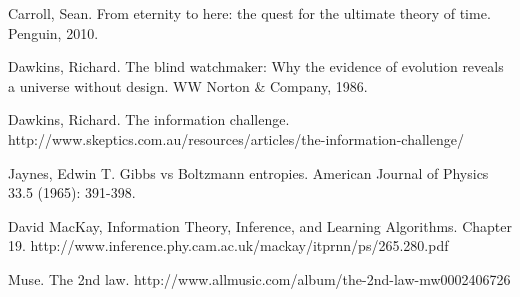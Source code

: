 \documentclass[a4paper, 12pt]{article}
\begin{document}
\begin{thebibliography}{999} %
Carroll, Sean. From eternity to here: the quest for the ultimate theory of time. Penguin, 2010.

Dawkins, Richard. The blind watchmaker: Why the evidence of evolution reveals a universe without design. WW Norton \& Company, 1986.

Dawkins, Richard. The information challenge.
http://www.skeptics.com.au/resources/articles/the-information-challenge/

Jaynes, Edwin T.
Gibbs vs Boltzmann entropies. American Journal of Physics 33.5 (1965): 391-398.

David MacKay, Information Theory, Inference, and Learning Algorithms.
Chapter 19.
http://www.inference.phy.cam.ac.uk/mackay/itprnn/ps/265.280.pdf

Muse. The 2nd law.
http://www.allmusic.com/album/the-2nd-law-mw0002406726
\end{thebibliography}
\end{document}
